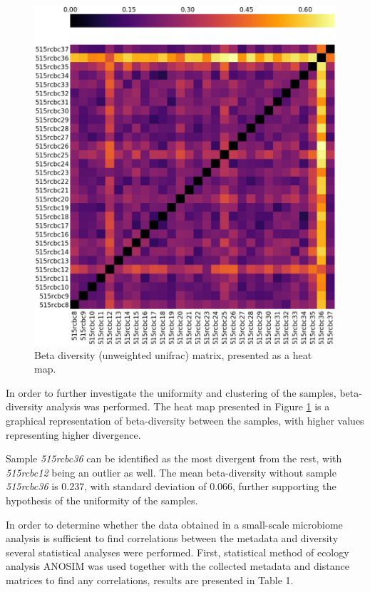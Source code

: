 \documentclass[12pt,twocolumn]{article} %
\begin{document}
\begin{figure}[ht!] %
	\includegraphics[width=\linewidth]{unweighted_beta.png}
	\caption{Beta diversity (unweighted unifrac) matrix, presented as a heat map.}
	\label{fig:beta_diversity}
\end{figure}
\par
In order to further investigate the uniformity and clustering of the samples, beta-diversity analysis was performed. The heat map presented in Figure \ref{fig:beta_diversity} is a graphical representation of beta-diversity between the samples, with higher values representing higher divergence.
\par
Sample \textit{515rcbc36} can be identified as the most divergent from the rest, with \textit{515rcbc12} being an outlier as well. The mean beta-diversity without sample \textit{515rcbc36} is 0.237, with standard deviation of 0.066, further supporting the hypothesis of the uniformity of the samples.
\par
In order to determine whether the data obtained in a small-scale microbiome analysis is sufficient to find correlations between the metadata and diversity several statistical analyses were performed. First, statistical method of ecology analysis ANOSIM\cite{CLARKE1993} was used together with the collected metadata and distance matrices to find any correlations, results are presented in Table 1.
\end{document}
